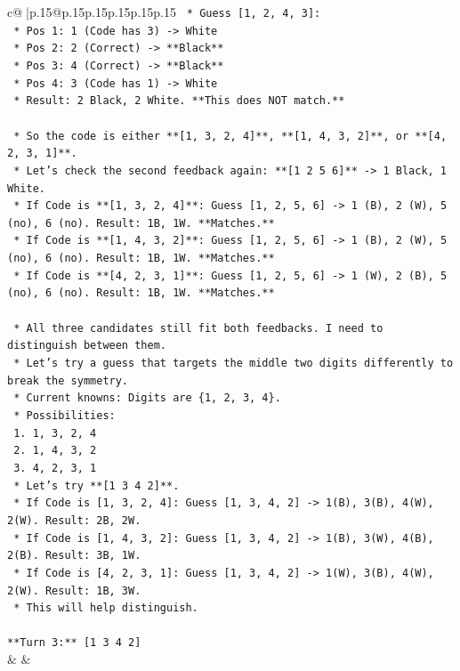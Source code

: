 \documentclass{article}
\begin{document}
{\begin{supertabular}{c@{$\;$}|p{.15\linewidth}@{}p{.15\linewidth}p{.15\linewidth}p{.15\linewidth}p{.15\linewidth}p{.15\linewidth}}
{{{\texttt{            *   Guess {[}1, 2, 4, 3{]}:} \\
\texttt{                *   Pos 1: 1 (Code has 3) {-}> White} \\
\texttt{                *   Pos 2: 2 (Correct) {-}> **Black**} \\
\texttt{                *   Pos 3: 4 (Correct) {-}> **Black**} \\
\texttt{                *   Pos 4: 3 (Code has 1) {-}> White} \\
\texttt{                *   Result: 2 Black, 2 White. **This does NOT match.**} \\
\\ 
\texttt{    *   So the code is either **{[}1, 3, 2, 4{]}**, **{[}1, 4, 3, 2{]}**, or **{[}4, 2, 3, 1{]}**.} \\
\texttt{    *   Let's check the second feedback again: **{[}1 2 5 6{]}** {-}> 1 Black, 1 White.} \\
\texttt{        *   If Code is **{[}1, 3, 2, 4{]}**: Guess {[}1, 2, 5, 6{]} {-}> 1 (B), 2 (W), 5 (no), 6 (no). Result: 1B, 1W. **Matches.**} \\
\texttt{        *   If Code is **{[}1, 4, 3, 2{]}**: Guess {[}1, 2, 5, 6{]} {-}> 1 (B), 2 (W), 5 (no), 6 (no). Result: 1B, 1W. **Matches.**} \\
\texttt{        *   If Code is **{[}4, 2, 3, 1{]}**: Guess {[}1, 2, 5, 6{]} {-}> 1 (W), 2 (B), 5 (no), 6 (no). Result: 1B, 1W. **Matches.**} \\
\\ 
\texttt{    *   All three candidates still fit both feedbacks. I need to distinguish between them.} \\
\texttt{    *   Let's try a guess that targets the middle two digits differently to break the symmetry.} \\
\texttt{    *   Current knowns: Digits are \{1, 2, 3, 4\}.} \\
\texttt{    *   Possibilities:} \\
\texttt{        1.  1, 3, 2, 4} \\
\texttt{        2.  1, 4, 3, 2} \\
\texttt{        3.  4, 2, 3, 1} \\
\texttt{    *   Let's try **{[}1 3 4 2{]}**.} \\
\texttt{        *   If Code is {[}1, 3, 2, 4{]}: Guess {[}1, 3, 4, 2{]} {-}> 1(B), 3(B), 4(W), 2(W). Result: 2B, 2W.} \\
\texttt{        *   If Code is {[}1, 4, 3, 2{]}: Guess {[}1, 3, 4, 2{]} {-}> 1(B), 3(W), 4(B), 2(B). Result: 3B, 1W.} \\
\texttt{        *   If Code is {[}4, 2, 3, 1{]}: Guess {[}1, 3, 4, 2{]} {-}> 1(W), 3(B), 4(W), 2(W). Result: 1B, 3W.} \\
\texttt{    *   This will help distinguish.} \\
\\ 
\texttt{**Turn 3:** {[}1 3 4 2{]}} \\
            }
        }
    }
    & & \\ \\


\end{supertabular}}
\end{document}
